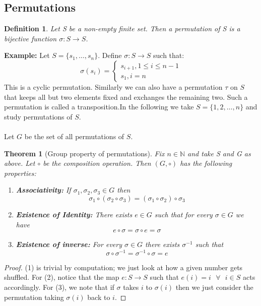 \documentclass{article}
\newtheorem{theorem}{Theorem}
\newtheorem{definition}{Definition}
\begin{document}
\subsection{Permutations}
\begin{definition}
    Let S be a non-empty finite set. Then a permutation of S is a bijective function $\sigma:S\to S$.
\end{definition}
\textbf{Example:} Let $S=\{s_1,\dots,s_n\}$. Define $\sigma: S\to S$ such that:
$$\sigma(s_i)=
\begin{cases}
s_{i+1}, 1\leq i\leq n-1 \\
s_1, i=n
\end{cases}
$$
This is a cyclic permutation. Similarly we can also have a permutation $\tau$ on $S$ that keeps all but two elements fixed and exchanges the remaining two. Such a permutation is called a transposition.In the following we take $S=\{1,2,\dots,n\}$ and study permutations of $S$.\\ \\
Let $G$ be the set of all permutations of $S$. 
\begin{theorem}[Group property of permutations]
    Fix $n\in \mathbb{N}$ and take S and G as above. Let $\circ$ be the composition operation. Then $(G,\circ)$ has the following properties:
    \begin{enumerate}
    \item \textbf{Associativity:} If $\sigma_1,\sigma_2,\sigma_3 \in G$ then $$\sigma_1\circ(\sigma_2\circ \sigma_3)=(\sigma_1\circ\sigma_2)\circ\sigma_3$$
    \item \textbf{Existence of Identity:} There exists $e\in G$ such that for every $\sigma\in G$ we have $$e\circ\sigma=\sigma\circ e=\sigma$$
    \item \textbf{Existence of inverse:} For every $\sigma\in G$ there exists $\sigma^{-1}$ such that $$\sigma\circ\sigma^{-1}=\sigma^{-1}\circ\sigma=e$$ 
    \end{enumerate}
\end{theorem}
\begin{proof}
(1) is trivial by computation; we just look at how a given number gets shuffled. For (2), notice that the map $e:S\to S$ such that $e(i)=i\text{ }\forall\text{ }i\in S$ acts accordingly. For (3), we note that if $\sigma$ takes $i$ to $\sigma(i)$ then we just consider the permutation taking $\sigma(i)$ back to $i$.
\end{proof}
\end{document}
